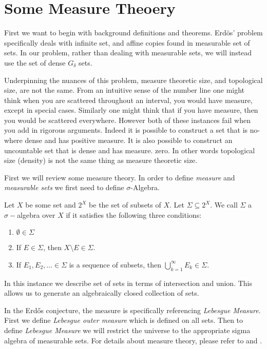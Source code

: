 \section{Some Measure Theoery}

First we want to begin with background definitions and theorems.  Erd\"{o}s' problem specifically deals with infinite set, and affine copies found in measurable set of sets.  In our problem, rather than dealing with measurable sets, we will instead use the set of dense $G_\delta$ sets.  

Underpinning the nuances of this problem, measure theoretic size, and topological size, are not the same. From an intuitive sense of the number line one might think when you are scattered throughout an interval, you would have measure, except in special cases. Similarly one might think that if you have measure, then you would be scattered everywhere.  However both of these instances fail when you add in rigorous arguments.  Indeed it is possible to construct a set that is no-where dense and has positive measure.  It is also possible to construct an uncountable set that is dense and has measure. zero.
 In other words topological size (density) is not the same thing as measure theoretic size. 

First we will review some measure theory.  In order to define \textit{measure} and \textit{measurable sets} we first need to define $\sigma$\hyphen{Algebra.}   



\begin{definition}
    Let $X$ be some set and $2^X$ be the set of subsets of $X$. Let $\Sigma \subseteq 2^X$. We call $\Sigma$ a $\sigma-$algebra over $X$ if it satisfies the following three conditions:
    \begin{enumerate}
        \item $\emptyset \in \Sigma$
        \item If $E \in \Sigma$, then $X\setminus E \in \Sigma$. 
        \item If $E_1, E_2, \dots \in \Sigma$ is a sequence of subsets, then $\bigcup_{k=1}^\infty E_k \in \Sigma$. 
    \end{enumerate}
\end{definition}

In this instance we describe set of sets in terms of intersection and union.  This allows us to generate an algebraically closed collection of sets.  

In the Erd\H{o}s conjecture, the measure is specifically referencing \textit{Lebesgue Measure}.  First we define \textit{Lebesgue outer measure} which is defined on all sets. Then to define \textit{Lebesgue Measure} we will restrict the universe to the appropriate sigma algebra of measurable sets. For details about measure theory, please refer to \cite{Axler} and \cite{Stein&Shak}.

